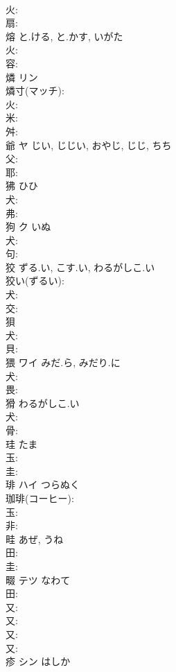 \documentclass[8pt]{extreport}
\begin{document}
\begin{CJK}{UTF8}{min}
\\	火: 
\\	扇: 
\\	熔		と.ける, と.かす, いがた			
\\	火: 
\\	容: 
\\	燐	リン			
\\	燐寸(マッチ): 
\\	火: 
\\	米: 
\\	舛: 
\\	爺	ヤ	じい, じじい, おやじ, じじ, ちち		
\\	父: 
\\	耶: 
\\	狒		ひひ			
\\	犬: 
\\	弗: 
\\	狗	ク	いぬ		
\\	犬: 
\\	句: 
\\	狡		ずる.い, こす.い, わるがしこ.い			
\\	狡い(ずるい): 
\\	犬: 
\\	交: 
\\	狽					
\\	犬: 
\\	貝: 
\\	猥	ワイ	みだ.ら, みだり.に		
\\	犬: 
\\	畏: 
\\	猾		わるがしこ.い			
\\	犬: 
\\	骨: 
\\	珪		たま			
\\	玉: 
\\	圭: 
\\	琲	ハイ	つらぬく		
\\	珈琲(コーヒー): 
\\	玉: 
\\	非: 
\\	畦		あぜ, うね			
\\	田: 
\\	圭: 
\\	畷	テツ	なわて		
\\	田: 
\\	又: 
\\	又: 
\\	又: 
\\	又: 
\\	疹	シン	はしか		

\end{CJK}
\end{document}

